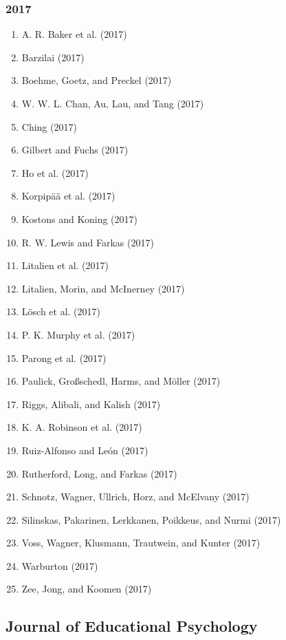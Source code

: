 \documentclass[english,man]{apa6}
\providecommand{\tightlist}{%
  \setlength{\itemsep}{0pt}\setlength{\parskip}{0pt}}
\theoremstyle{definition}
\theoremstyle{definition}
\theoremstyle{definition}
\theoremstyle{remark}
\begin{document}
\subsubsection{2017}\label{section-17}

\begin{enumerate}
\def\labelenumi{\arabic{enumi})}
\tightlist
\item
  A. R. Baker et al. (2017)
\item
  Barzilai (2017)
\item
  Boehme, Goetz, and Preckel (2017)
\item
  W. W. L. Chan, Au, Lau, and Tang (2017)
\item
  Ching (2017)
\item
  Gilbert and Fuchs (2017)
\item
  Ho et al. (2017)
\item
  Korpipää et al. (2017)
\item
  Kostons and Koning (2017)
\item
  R. W. Lewis and Farkas (2017)
\item
  Litalien et al. (2017)
\item
  Litalien, Morin, and McInerney (2017)
\item
  Lösch et al. (2017)
\item
  P. K. Murphy et al. (2017)
\item
  Parong et al. (2017)
\item
  Paulick, Großschedl, Harms, and Möller (2017)
\item
  Riggs, Alibali, and Kalish (2017)
\item
  K. A. Robinson et al. (2017)
\item
  Ruiz-Alfonso and León (2017)
\item
  Rutherford, Long, and Farkas (2017)
\item
  Schnotz, Wagner, Ullrich, Horz, and McElvany (2017)
\item
  Silinskas, Pakarinen, Lerkkanen, Poikkeus, and Nurmi (2017)
\item
  Voss, Wagner, Klusmann, Trautwein, and Kunter (2017)
\item
  Warburton (2017)
\item
  Zee, Jong, and Koomen (2017)
\end{enumerate}

\subsection{Journal of Educational
Psychology}\label{journal-of-educational-psychology}
\end{document}
